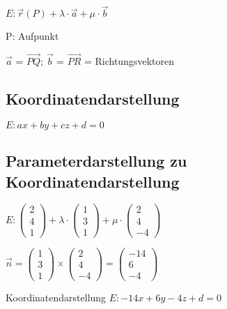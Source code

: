 \begin{multicols*}{3}
    {\large $ E: \vec{r}(P) + \lambda \cdot \vec{a} + \mu \cdot \vec{b} $}

    {P: Aufpunkt}

    {$ \vec{a}$ = $\overrightarrow{PQ} $; $ \vec{b}$ = $\overrightarrow{PR} $ = Richtungsvektoren}



    \subsection{Koordinatendarstellung}
    {$E: ax + by + cz + d = 0 $}

    \subsection{Parameterdarstellung zu Koordinatendarstellung}

    $ E: \begin{pmatrix}
            2 \\
            4 \\
            1
        \end{pmatrix} + \lambda \cdot
        \begin{pmatrix}
            1 \\
            3 \\
            1
        \end{pmatrix} + \mu \cdot
        \begin{pmatrix}
            2 \\
            4 \\
            -4
        \end{pmatrix}$

    $\vec{n}=
        \begin{pmatrix}
            1 \\
            3 \\
            1
        \end{pmatrix} \times \begin{pmatrix}
            2 \\
            4 \\
            -4
        \end{pmatrix} = \begin{pmatrix}
            -14 \\
            6   \\
            -4
        \end{pmatrix} $

     Koordinatendarstellung $ E: -14x + 6y - 4z + d = 0$


\end{multicols*}

